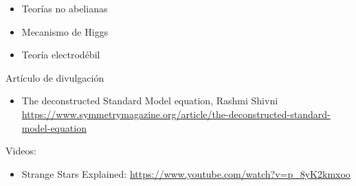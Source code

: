 \begin{itemize}
\item Teorías no abelianas \cite{Yang:1954ek}
\item Mecanismo de Higgs \cite{Higgs:1964pj}
\item Teoría electrodébil \cite{Weinberg:1967tq}
\end{itemize}

Artículo de divulgación
\begin{itemize}
\item The deconstructed Standard Model equation, Rashmi Shivni \url{https://www.symmetrymagazine.org/article/the-deconstructed-standard-model-equation}
\end{itemize}

Videos:
\begin{itemize}
\item Strange Stars Explained: \url{https://www.youtube.com/watch?v=p_8yK2kmxoo}
\end{itemize}

%
